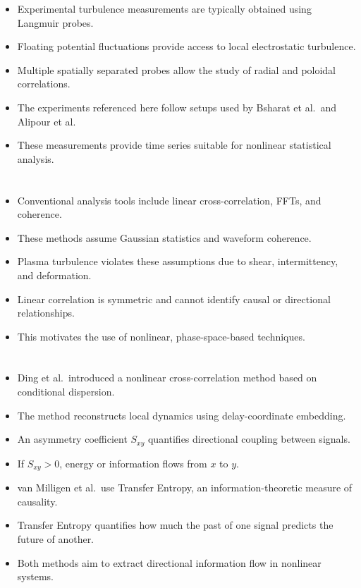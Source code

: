 \documentclass{article}
\begin{document}
\begin{itemize}
\item Experimental turbulence measurements are typically obtained using Langmuir probes.
\item Floating potential fluctuations provide access to local electrostatic turbulence.
\item Multiple spatially separated probes allow the study of radial and poloidal correlations.
\item The experiments referenced here follow setups used by Bsharat et al.\ and Alipour et al.
\item These measurements provide time series suitable for nonlinear statistical analysis.
\end{itemize}

\section{}

\begin{itemize}
\item Conventional analysis tools include linear cross-correlation, FFTs, and coherence.
\item These methods assume Gaussian statistics and waveform coherence.
\item Plasma turbulence violates these assumptions due to shear, intermittency, and deformation.
\item Linear correlation is symmetric and cannot identify causal or directional relationships.
\item This motivates the use of nonlinear, phase-space-based techniques.
\end{itemize}

\section{}

\begin{itemize}
\item Ding et al.\ introduced a nonlinear cross-correlation method based on conditional dispersion.
\item The method reconstructs local dynamics using delay-coordinate embedding.
\item An asymmetry coefficient $S_{xy}$ quantifies directional coupling between signals.
\item If $S_{xy} > 0$, energy or information flows from $x$ to $y$.
\item van Milligen et al.\ use Transfer Entropy, an information-theoretic measure of causality.
\item Transfer Entropy quantifies how much the past of one signal predicts the future of another.
\item Both methods aim to extract directional information flow in nonlinear systems.
\end{itemize}
\end{document}
